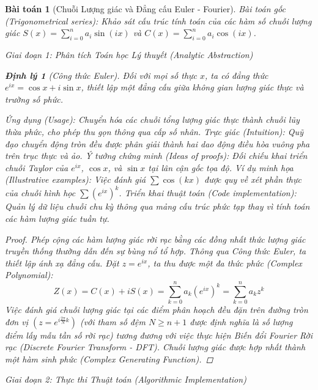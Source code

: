 \documentclass{article}
\newtheorem{baitoan}{Bài toán}
\newtheorem{dinhly}{Định lý}
\begin{document}
\begin{baitoan}[Chuỗi Lượng giác và Đẳng cấu Euler - Fourier]
 \emph{Bài toán gốc (Trigonometrical series):} 
 Khảo sát cấu trúc tính toán của các hàm số chuỗi lượng giác $S(x) = \sum_{i=0}^n a_i\sin(ix)$ và $C(x) = \sum_{i=0}^n a_i\cos(ix)$.

\vspace{0.5em}\noindent\emph{Giai đoạn 1: Phân tích Toán học Lý thuyết (Analytic Abstraction)}
 
\begin{dinhly}[Công thức Euler]
Đối với mọi số thực $x$, ta có đẳng thức $e^{ix} = \cos x + i\sin x$, thiết lập một đẳng cấu giữa không gian lượng giác thực và trường số phức.
\end{dinhly}
\emph{Ứng dụng (Usage):} Chuyển hóa các chuỗi tổng lượng giác thực thành chuỗi lũy thừa phức, cho phép thu gọn thông qua cấp số nhân.
\emph{Trực giác (Intuition):} Quỹ đạo chuyển động tròn đều được phân giải thành hai dao động điều hòa vuông pha trên trục thực và ảo.
\emph{Ý tưởng chứng minh (Ideas of proofs):} Đối chiếu khai triển chuỗi Taylor của $e^{ix}$, $\cos x$, và $\sin x$ tại lân cận gốc tọa độ.
\emph{Ví dụ minh họa (Illustrative examples):} Việc đánh giá $\sum \cos(kx)$ được quy về xét phần thực của chuỗi hình học $\sum (e^{ix})^k$.
\emph{Triển khai thuật toán (Code implementation):} Quản lý dữ liệu chuỗi chu kỳ thông qua mảng cấu trúc phức tạp thay vì tính toán các hàm lượng giác tuần tự.

 \begin{proof}
 Phép cộng các hàm lượng giác rời rạc bằng các đồng nhất thức lượng giác truyền thống thường dẫn đến sự bùng nổ tổ hợp. Thông qua \emph{Công thức Euler}, ta thiết lập ánh xạ đẳng cấu. Đặt $z = e^{ix}$, ta thu được một đa thức phức (Complex Polynomial):
 \begin{equation}
 Z(x) = C(x) + i S(x) = \sum_{k=0}^n a_k (e^{ix})^k = \sum_{k=0}^n a_k z^k
 \end{equation}
 Việc đánh giá chuỗi lượng giác tại các điểm phân hoạch đều đặn trên đường tròn đơn vị $\left(z = e^{i\frac{2\pi}{N}k}\right)$ (với tham số đệm $N \ge n+1$ được định nghĩa là số lượng điểm lấy mẫu tần số rời rạc) tương đương với việc thực hiện Biến đổi Fourier Rời rạc (Discrete Fourier Transform - DFT). Chuỗi lượng giác được hợp nhất thành một hàm sinh phức (Complex Generating Function).

  \end{proof}

\vspace{0.5em}\noindent\emph{Giai đoạn 2: Thực thi Thuật toán (Algorithmic Implementation)}
 

\end{baitoan}
\end{document}
